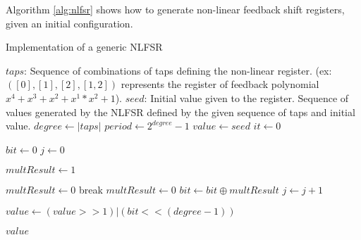 \documentclass{llncs}
\begin{document}
Algorithm \ref{alg:nlfsr} shows how to generate non-linear feedback shift registers, given an initial configuration.

\begin{algorithm}[ht]
  \caption{Implementation of a generic NLFSR}\label{alg:nlfsr}
  \begin{algorithmic}[1]
    \Require
      \Statex $taps$: Sequence of combinations of taps defining the non-linear register. (ex: $([0],[1],[2],[1,2])$ represents the register of feedback polynomial $x^4 + x^3 + x^2  + x^1*x^2 + 1$).
      \Statex $seed$: Initial value given to the register.
    \Ensure
      \Statex Sequence of values generated by the NLFSR defined by the given sequence of taps and initial value.
    \Statex
    \State $degree \gets |taps|$ 
    \State $period \gets 2^{degree} - 1$ 
    \State $value \gets seed$ 
    \State $it \gets 0$
    
        \State $bit \gets 0$
        \State $j \gets 0$
            
        		\State $multResult \gets 1$
                
                    	\State $multResult \gets 0$
                        \State break
                    \EndIf
                \EndFor
            \Else
            	\State $multResult \gets 0$
            \EndIf
            \State $bit \gets bit \oplus multResult$ 
            \State $j \gets j+1$
    	\EndFor
        
        \State $value \gets (value >> 1) | (bit << (degree-1))$
        
        \Return $value$ 
    \EndWhile
  \end{algorithmic}
\end{algorithm}
\end{document}
